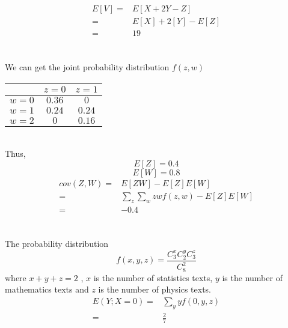 \documentclass{article}
\begin{document}
        \begin{equation*}
            \begin{split}
                E[V]=&E[X+2Y-Z]\\
                    =&E[X]+2[Y]-E[Z]\\
                    =&19
            \end{split}
        \end{equation*}
    
    \section{}
    We can get the joint probability distribution $f(z,w)$
    \textbf{ }\\

    \begin{tabular}{|c|c|c|}
        \hline        & $z=0$ & $z=1$ \\
        \hline  $w=0$ & $0.36$ & $0$\\
        \hline  $w=1$ & $0.24$ & $0.24$  \\
        \hline  $w=2$ & $0$ & $0.16$ \\
        \hline
    \end{tabular} 

    \textit{ }\\
    Thus, $$E[Z]=0.4$$
    $$E[W]=0.8$$
    \begin{equation*}
        \begin{split}
            cov(Z,W)=&E[ZW]-E[Z]E[W]\\
                =&\sum _z \sum _w zwf(z,w)-E[Z]E[W]\\
                =&-0.4
        \end{split}
    \end{equation*}
	
    \section{}
    The probability distribution $$f(x,y,z)=\frac{C_3 ^x C_2 ^y C _3 ^z}{C_8 ^2}$$
    where $x+y+z=2$ , $x$ is the number of statistics texts, $y$ is the number of mathematics texts and $z$ is the number of physics texts.
        \begin{equation*}
            \begin{split}
                E(Y;X=0)=&\sum _y yf(0,y,z)\\
                    =&\frac{2}{7}
            \end{split}
        \end{equation*}
\end{document}
